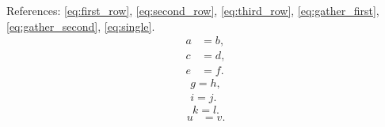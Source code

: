 \documentclass{article}
\begin{document}
References: \ref{eq:first_row}, \ref{eq:second_row}, \ref{eq:third_row},
\ref{eq:gather_first}, \ref{eq:gather_second}, \ref{eq:single}.
\begin{align}
 a &= b, \label{eq:first_row}\\
 c &= d, \label{eq:second_row}\\
 e &= f. \label{eq:third_row}
\end{align}
\begin{gather}
 g=h, \label{eq:gather_first}\\
 i=j. \label{eq:gather_second}
\end{gather}
\begin{equation}
 k=l. \label{eq:single}
\end{equation}
\begin{align*}
 u &= v. %
\end{align*}
\end{document}

